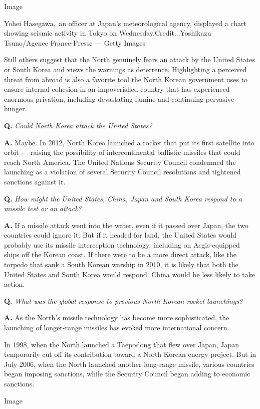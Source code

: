 Image

Yohei Hasegawa,~an officer at Japan's meteorological agency, displayed a
chart showing seismic activity in Tokyo on Wednesday.Credit...Yoshikazu
Tsuno/Agence France-Presse --- Getty Images

Still others suggest that the North genuinely fears an attack by the
United States or South Korea and views the warnings as deterrence.
Highlighting a perceived threat from abroad is also a favorite tool the
North Korean government uses to ensure internal cohesion in an
impoverished country that has experienced enormous privation, including
devastating famine and continuing pervasive hunger.

\textbf{Q.} \emph{Could North Korea attack the United States?}

\textbf{A.} Maybe. In 2012, North Korea launched a rocket that put its
first satellite into orbit --- raising the possibility of
intercontinental ballistic missiles that could reach North America. The
United Nations Security Council condemned the launching as a violation
of several Security Council resolutions and tightened sanctions against
it.

\textbf{Q.} \emph{How might the United States, China, Japan and South
Korea respond to a missile test or an attack?}

\textbf{A.} If a missile attack went into the water, even if it passed
over Japan, the two countries could ignore it. But if it headed for
land, the United States would probably use its missile interception
technology, including on Aegis-equipped ships off the Korean coast. If
there were to be a more direct attack, like the torpedo that sank a
South Korean warship in 2010, it is likely that both the United States
and South Korea would respond. China would be less likely to take
action.

\textbf{Q.} \emph{What was the global response to previous North Korean
rocket launchings?}

\textbf{A.} As the North's missile technology has become more
sophisticated, the launching of longer-range missiles has evoked more
international concern.

In 1998, when the North launched a Taepodong that flew over Japan, Japan
temporarily cut off its contribution toward a North Korean energy
project. But in July 2006, when the North launched another long-range
missile, various countries began imposing sanctions, while the Security
Council began adding to economic sanctions.

Image

